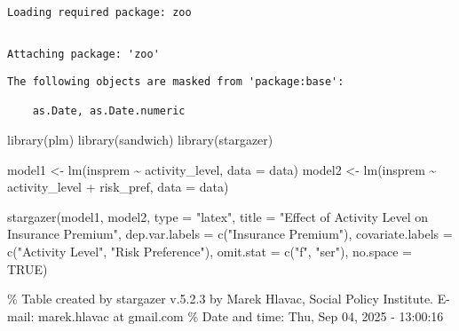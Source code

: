 \documentclass[
  letterpaper,
  DIV=11,
  numbers=noendperiod]{scrartcl}
\newenvironment{Shaded}{\begin{snugshade}}{\end{snugshade}}
\newcommand{\AttributeTok}[1]{\textcolor[rgb]{0.40,0.45,0.13}{#1}}
\newcommand{\ConstantTok}[1]{\textcolor[rgb]{0.56,0.35,0.01}{#1}}
\newcommand{\FunctionTok}[1]{\textcolor[rgb]{0.28,0.35,0.67}{#1}}
\newcommand{\NormalTok}[1]{\textcolor[rgb]{0.00,0.23,0.31}{#1}}
\newcommand{\OtherTok}[1]{\textcolor[rgb]{0.00,0.23,0.31}{#1}}
\newcommand{\SpecialCharTok}[1]{\textcolor[rgb]{0.37,0.37,0.37}{#1}}
\newcommand{\StringTok}[1]{\textcolor[rgb]{0.13,0.47,0.30}{#1}}
\begin{document}
\begin{verbatim}
Loading required package: zoo
\end{verbatim}

\begin{verbatim}

Attaching package: 'zoo'
\end{verbatim}

\begin{verbatim}
The following objects are masked from 'package:base':

    as.Date, as.Date.numeric
\end{verbatim}

\begin{Shaded}
\begin{Highlighting}[]
\FunctionTok{library}\NormalTok{(plm)}
\FunctionTok{library}\NormalTok{(sandwich)}
\FunctionTok{library}\NormalTok{(stargazer)}

\NormalTok{model1 }\OtherTok{\textless{}{-}} \FunctionTok{lm}\NormalTok{(insprem }\SpecialCharTok{\textasciitilde{}}\NormalTok{ activity\_level, }\AttributeTok{data =}\NormalTok{ data)}
\NormalTok{model2 }\OtherTok{\textless{}{-}} \FunctionTok{lm}\NormalTok{(insprem }\SpecialCharTok{\textasciitilde{}}\NormalTok{ activity\_level }\SpecialCharTok{+}\NormalTok{ risk\_pref, }\AttributeTok{data =}\NormalTok{ data)}

\FunctionTok{stargazer}\NormalTok{(model1, model2,}
  \AttributeTok{type =} \StringTok{"latex"}\NormalTok{,}
  \AttributeTok{title =} \StringTok{"Effect of Activity Level on Insurance Premium"}\NormalTok{,}
  \AttributeTok{dep.var.labels =} \FunctionTok{c}\NormalTok{(}\StringTok{"Insurance Premium"}\NormalTok{),}
  \AttributeTok{covariate.labels =} \FunctionTok{c}\NormalTok{(}\StringTok{"Activity Level"}\NormalTok{, }\StringTok{"Risk Preference"}\NormalTok{),}
  \AttributeTok{omit.stat =} \FunctionTok{c}\NormalTok{(}\StringTok{"f"}\NormalTok{, }\StringTok{"ser"}\NormalTok{),}
  \AttributeTok{no.space =} \ConstantTok{TRUE}\NormalTok{)}
\end{Highlighting}
\end{Shaded}

\% Table created by stargazer v.5.2.3 by Marek Hlavac, Social Policy
Institute. E-mail: marek.hlavac at gmail.com \% Date and time: Thu, Sep
04, 2025 - 13:00:16
\end{document}
